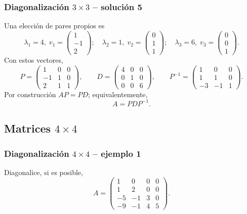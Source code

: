 \subsubsection*{Diagonalización $3\times 3$ -- solución 5}
\scriptsize
Una elección de pares propios es
\[
\lambda_1=4,\;v_1=\begin{pmatrix}1\\-1\\2\end{pmatrix};\quad \lambda_2=1,\;v_2=\begin{pmatrix}0\\1\\1\end{pmatrix};\quad \lambda_3=6,\;v_3=\begin{pmatrix}0\\0\\1\end{pmatrix}.
\]
Con estos vectores,
\[
P=\begin{pmatrix}1 & 0 & 0\\-1 & 1 & 0\\2 & 1 & 1\end{pmatrix},\qquad D=\begin{pmatrix}4 & 0 & 0\\0 & 1 & 0\\0 & 0 & 6\end{pmatrix},\qquad P^{-1}=\begin{pmatrix}1 & 0 & 0\\1 & 1 & 0\\-3 & -1 & 1\end{pmatrix}.
\]
Por construcción $AP=PD$; equivalentemente,
\[
\boxed{A=PDP^{-1}}.
\]

\subsection{Matrices $4\times 4$}

\subsubsection*{Diagonalización $4\times 4$ -- ejemplo 1}

Diagonalice, si es posible,
\[
A=\begin{pmatrix}1 & 0 & 0 & 0\\1 & 2 & 0 & 0\\-5 & -1 & 3 & 0\\-9 & -1 & 4 & 5\end{pmatrix}.
\]

